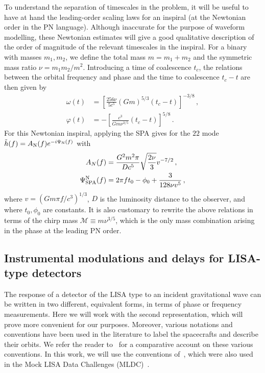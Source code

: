 \documentclass[aps,showpacs,%
prd,superscriptaddress,nofootinbib]{revtex4}
\newcommand\calM{{\mathcal{M}}}
\begin{document}
To understand the separation of timescales in the problem, it will be useful to have at hand the leading-order scaling laws for an inspiral (at the Newtonian order in the PN language). Although inaccurate for the purpose of waveform modelling, these Newtonian estimates will give a good qualitative description of the order of magnitude of the relevant timescales in the inspiral. For a binary with masses $m_{1}, m_{2}$, we define the total mass $m=m_{1}+m_{2}$ and the symmetric mass ratio $\nu = m_{1}m_{2}/m^{2}$. Introducing a time of coalescence $t_{c}$, the relations between the orbital frequency and phase and the time to coalescence $t_{c} - t$ are then given by
\begin{subequations}
\begin{align}
	\omega(t) &= \left[ \frac{256\nu}{5c^{5}} (Gm)^{5/3} (t_{c}-t) \right]^{-3/8} \,, \\
	\varphi(t) &= -\left[ \frac{c^{3}}{G m \nu^{3/5}} (t_{c}-t) \right]^{5/8} \,.
\end{align}
\end{subequations}
For this Newtonian inspiral, applying the SPA gives for the $22$ mode $\tilde{h}(f) = A_{\rm N}(f)e^{-i\Psi_{\rm N}(f)}$ with
%
\begin{subequations}
\begin{align}
	A_{N}(f) &= \frac{G^{2}m^{2} \pi}{Dc^{5}} \sqrt{\frac{2\nu}{3}} v^{-7/2}\,,\\
	\Psi_{\rm SPA}^{\rm N}(f) &= 2\pi f t_{0} - \phi_{0} + \frac{3}{128\nu v^{5}} \,, 
\end{align}
\end{subequations}
%
where $v=(G m \pi f/c^{3})^{1/3}$, $D$ is the luminosity distance to the observer, and where $t_{0}, \phi_{0}$ are constants. It is also customary to rewrite the above relations in terms of the chirp mass $\calM \equiv m\nu^{3/5}$, which is the only mass combination arising in the phase at the leading PN order.


\subsection{Instrumental modulations and delays for LISA-type detectors}
\label{subsec:modulationLISA}

The response of a detector of the LISA type to an incident gravitational wave can be written in two different, equivalent forms, in terms of phase or frequency measurements. Here we will work with the second representation, which will prove more convenient for our purposes. Moreover, various notations and conventions have been used in the literature to label the spacecrafts and describe their orbits. We refer the reader to~\cite{Vallisneri04} for a comparative account on these various conventions. In this work, we will use the conventions of~\cite{Vallisneri04}, which were also used in the Mock LISA Data Challenges (MLDC)~\cite{}.
\end{document}
